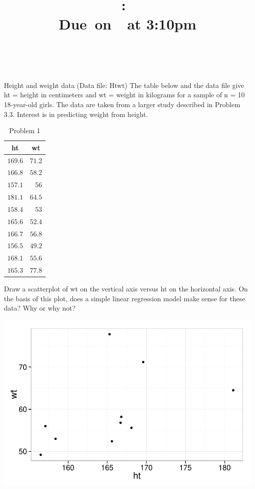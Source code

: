 \documentclass[12pt,oneside,a4paper]{article}\usepackage[]{graphicx}\usepackage[]{xcolor}
\title{
    \vspace{2in}
    \textmd{\textbf{\hmwkClass:\ \hmwkTitle}}\\
    \normalsize\vspace{0.1in}\small{Due\ on\ \hmwkDueDate\ at 3:10pm}\\
    \vspace{0.1in}\large{\textit{\hmwkClassInstructor\ \hmwkClassTime}}
    \vspace{3in}
}
\author{\textbf{\hmwkAuthorName}}
\date{}
\newenvironment{knitrout}{}{} %
\newenvironment{problem}[2][Problem]{\begin{trivlist}
\item[\hskip \labelsep {\bfseries #1}\hskip \labelsep {\bfseries #2.}]}{\end{trivlist}}
\begin{document}
\maketitle

\pagebreak
 


\begin{problem}{2.1}
Height and weight data (Data file: Htwt) The table below and the data file give ht = height in centimeters and wt = weight in kilograms for a sample of n  =  10 18-year-old girls. The data are taken from a larger study described in Problem 3.3. Interest is in predicting weight from height.

\begin{table}[ht!]
\centering
\caption{Problem 1}
\begin{tabular}{rr}
\toprule
 \multicolumn{1}{c}{ ht } & \multicolumn{1}{c}{ wt } \\
\midrule
 $169.6$ & $71.2$ \\
 $166.8$ & $58.2$ \\
 $157.1$ & $56$ \\
 $181.1$ & $64.5$ \\
 $158.4$ & $53$ \\
 $165.6$ & $52.4$ \\
 $166.7$ & $56.8$ \\
 $156.5$ & $49.2$ \\
 $168.1$ & $55.6$ \\
 $165.3$ & $77.8$ \\
\bottomrule
\end{tabular}
\label{Problem 1}
\end{table}

\end{problem} 

\begin{problem}{2.1.1} Draw a scatterplot of wt on the vertical axis versus ht on the horizontal axis. On the basis of this plot, does a simple linear regression model make sense for these data? Why or why not?
\end{problem}

\begin{knitrout}
\color{fgcolor}

{\centering \includegraphics[width=.6\linewidth]{figure/p211} 

}



\end{knitrout}
\end{document}
